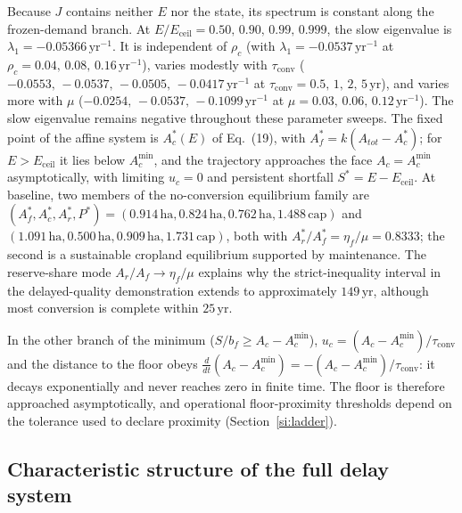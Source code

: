 \documentclass[11pt,a4paper]{article}
\newcommand{\Eceil}{E_{\mathrm{ceil}}}
\newcommand{\Acmin}{A_c^{\min}}
\newcommand{\tconv}{\tau_{\mathrm{conv}}}
\begin{document}
Because $J$ contains neither $E$ nor the state, its spectrum is constant along the frozen-demand branch. At $E/\Eceil=0.50,\,0.90,\,0.99,\,0.999$, the slow eigenvalue is $\lambda_1=-0.05366\,\mathrm{yr}^{-1}$. It is independent of $\rho_c$ (with $\lambda_1=-0.0537\,\mathrm{yr}^{-1}$ at $\rho_c=0.04,\,0.08,\,0.16\,\mathrm{yr}^{-1}$), varies modestly with $\tconv$ ($-0.0553,\,-0.0537,\,-0.0505,\,-0.0417\,\mathrm{yr}^{-1}$ at $\tconv=0.5,\,1,\,2,\,5\,\mathrm{yr}$), and varies more with $\mu$ ($-0.0254,\,-0.0537,\,-0.1099\,\mathrm{yr}^{-1}$ at $\mu=0.03,\,0.06,\,0.12\,\mathrm{yr}^{-1}$). The slow eigenvalue remains negative throughout these parameter sweeps. The fixed point of the affine system is $A_c^*(E)$ of Eq.~(19), with $A_f^*=k(A_{tot}-A_c^*)$; for $E>\Eceil$ it lies below $\Acmin$, and the trajectory approaches the face $A_c=\Acmin$ asymptotically, with limiting $u_c=0$ and persistent shortfall $S^*=E-\Eceil$. At baseline, two members of the no-conversion equilibrium family are $(A_f^*,A_c^*,A_r^*,P^*)=(0.914\,\mathrm{ha},0.824\,\mathrm{ha},0.762\,\mathrm{ha},1.488\,\mathrm{cap})$ and $(1.091\,\mathrm{ha},0.500\,\mathrm{ha},0.909\,\mathrm{ha},1.731\,\mathrm{cap})$, both with $A_r^*/A_f^*=\eta_f/\mu=0.8333$; the second is a sustainable cropland equilibrium supported by maintenance. The reserve-share mode $A_r/A_f\to\eta_f/\mu$ explains why the strict-inequality interval in the delayed-quality demonstration extends to approximately $149\,\mathrm{yr}$, although most conversion is complete within $25\,\mathrm{yr}$.

In the other branch of the minimum ($S/b_f\ge A_c-\Acmin$), $u_c=(A_c-\Acmin)/\tconv$ and the distance to the floor obeys $\frac{d}{dt}(A_c-\Acmin)=-(A_c-\Acmin)/\tconv$: it decays exponentially and never reaches zero in finite time. The floor is therefore approached asymptotically, and operational floor-proximity thresholds depend on the tolerance used to declare proximity (Section~\ref{si:ladder}).

\subsection{Characteristic structure of the full delay system}\label{si:char}
\end{document}
